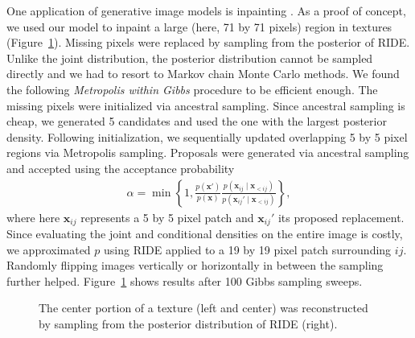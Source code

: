 \documentclass{article}
\begin{document}
		One application of generative image models is inpainting \cite[e.g.,][]{Roth:2009,Heess:2009,Sohl-Dickstein:2015}.
		As a proof of concept, we used our model to inpaint a large (here, 71 by 71 pixels) region
		in textures (Figure~\ref{fig:inpainting}). Missing pixels were replaced by sampling from the posterior of RIDE.
		Unlike the joint distribution, the posterior distribution cannot be sampled directly and we had to resort to Markov
		chain Monte Carlo methods. We found the following \textit{Metropolis within
		Gibbs} \cite{Tierney:1994} procedure to be efficient enough. The missing pixels were initialized via ancestral sampling. Since
		ancestral sampling is cheap, we generated 5 candidates and used the one with
		the largest posterior density. Following initialization, we sequentially updated
		overlapping 5 by 5 pixel regions via Metropolis sampling. Proposals were generated
		via ancestral sampling and accepted using the acceptance probability
		\begin{align}
			\textstyle\alpha = \min\left\{ 1, \frac{p(\mathbf{x}')}{p(\mathbf{x})} \frac{p(\mathbf{x}_{ij} \mid \mathbf{x}_{<ij})}{p(\mathbf{x}_{ij}' \mid \mathbf{x}_{<ij})} \right\},
		\end{align}
		where here $\mathbf{x}_{ij}$ represents a 5 by 5 pixel patch and $\mathbf{x}_{ij}'$ its
		proposed replacement. Since evaluating the joint and conditional densities on the entire image is
		costly, we approximated $p$ using RIDE applied to a 19 by 19 pixel patch surrounding $ij$.
		Randomly flipping images vertically or horizontally in between the sampling further helped.
		Figure~\ref{fig:inpainting} shows results after 100 Gibbs sampling sweeps.
		\vspace{-.15cm}
		\begin{figure}
			\vspace{-.2cm}
			\centering
 			\vspace{-.6cm}
			\caption{The center portion of a texture (left and center) was reconstructed by sampling from the
			posterior distribution of RIDE (right).}
			\label{fig:inpainting}
		\end{figure}
\end{document}
